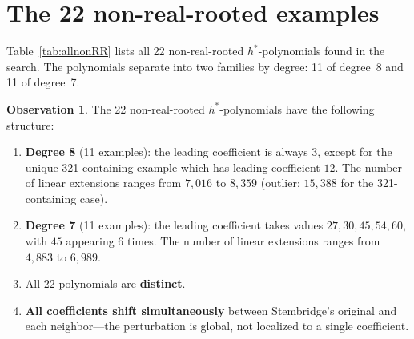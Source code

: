 \documentclass[11pt,reqno]{amsart}
\theoremstyle{definition}
\newtheorem{observation}[theorem]{Observation}
\begin{document}
\section{The 22 non-real-rooted examples}\label{sec:table}

Table~\ref{tab:allnonRR} lists all 22 non-real-rooted $h^*$-polynomials
found in the search.
The polynomials separate into two families by degree:
11 of degree~8 and 11 of degree~7.

\begin{observation}\label{obs:twofamilies}
The 22 non-real-rooted $h^*$-polynomials have the following structure:
\begin{enumerate}
\item \textbf{Degree 8} (11 examples): the leading coefficient is
  always $3$, except for the unique 321-containing example which
  has leading coefficient $12$.
  The number of linear extensions ranges from $7{,}016$ to $8{,}359$
  (outlier: $15{,}388$ for the 321-containing case).
\item \textbf{Degree 7} (11 examples): the leading coefficient
  takes values $27, 30, 45, 54, 60$, with $45$ appearing 6 times.
  The number of linear extensions ranges from $4{,}883$ to $6{,}989$.
\item All 22 polynomials are \textbf{distinct}.
\item \textbf{All coefficients shift simultaneously} between
  Stembridge's original and each neighbor---the perturbation is
  global, not localized to a single coefficient.
\end{enumerate}
\end{observation}
\end{document}
